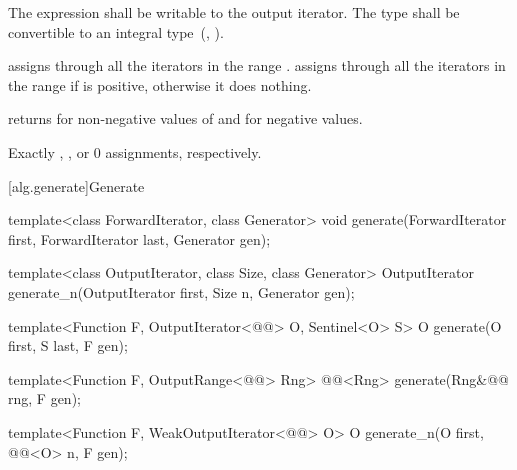 \begin{itemdescr}
\begin{removedblock}
\pnum
\requires
The expression
shall be writable to the output iterator. The type
shall be convertible to an integral type~(, ).
\end{removedblock}

\pnum
\effects
{} assigns  through all the
iterators in the range . 
assigns  through all the iterators in the range 
if  is positive, otherwise it does nothing.

\pnum
\returns {} returns 
for non-negative values of  and  for negative values.

\pnum
\complexity
Exactly
,
, or 0 assignments, respectively.
\end{itemdescr}

[alg.generate]{Generate}

%
%
\begin{removedblock}
\begin{itemdecl}
template<class ForwardIterator, class Generator>
  void generate(ForwardIterator first, ForwardIterator last,
                Generator gen);

template<class OutputIterator, class Size, class Generator>
  OutputIterator generate_n(OutputIterator first, Size n, Generator gen);
\end{itemdecl}
\end{removedblock}
\begin{addedblock}
\begin{itemdecl}
template<Function F, OutputIterator<@@> O,
    Sentinel<O> S>
  O generate(O first, S last, F gen);

template<Function F, OutputRange<@@> Rng>
  @@<Rng>
    generate(Rng&@\newtxt{\&}@ rng, F gen);

template<Function F, WeakOutputIterator<@@> O>
  O generate_n(O first, @@<O> n, F gen);
\end{itemdecl}
\end{addedblock}

